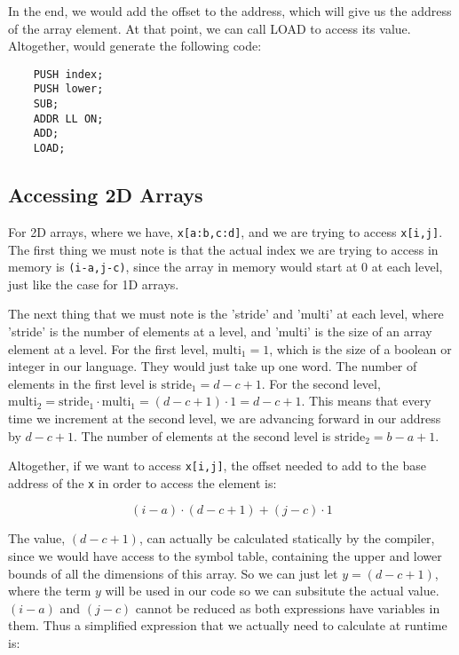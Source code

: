 \documentclass{article}
\begin{document}
In the end, we would add the offset to the address, which will give us the address of the array element. At that point, we can call LOAD to access its value. Altogether, would generate the following code:

\begin{lstlisting}
    PUSH index;
    PUSH lower;
    SUB;
    ADDR LL ON;
    ADD;
    LOAD;
\end{lstlisting}

\subsection{Accessing 2D Arrays}

For 2D arrays, where we have, \texttt{x[a:b,c:d]}, and we are trying to access \texttt{x[i,j]}. The first thing we must note is that the actual index we are trying to access in memory is \texttt{(i-a,j-c)}, since the array in memory would start at 0 at each level, just like the case for 1D arrays.

The next thing that we must note is the 'stride' and 'multi' at each level, where 'stride' is the number of elements at a level, and 'multi' is the size of an array element at a level. For the first level, $\text{multi}_1 = 1$, which is the size of a boolean or integer in our language. They would just take up one word. The number of elements in the first level is $\text{stride}_1 = d - c + 1$. For the second level, $\text{multi}_2 = \text{stride}_1 \cdot \text{multi}_1 = (d - c + 1) \cdot 1 = d - c + 1$. This means that every time we increment at the second level, we are advancing forward in our address by $d - c + 1$. The number of elements at the second level is $\text{stride}_2 = b - a + 1$.

Altogether, if we want to access \texttt{x[i,j]}, the offset needed to add to the base address of the \texttt{x} in order to access the element is:

$$(i - a) \cdot (d - c + 1) + (j - c) \cdot 1$$

The value, $(d - c + 1)$, can actually be calculated statically by the compiler, since we would have access to the symbol table, containing the upper and lower bounds of all the dimensions of this array. So we can just let $y = (d - c + 1)$, where the term $y$ will be used in our code so we can subsitute the actual value. $(i - a)$ and $(j - c)$ cannot be reduced as both expressions have variables in them. Thus a simplified expression that we actually need to calculate at runtime is:
\end{document}
